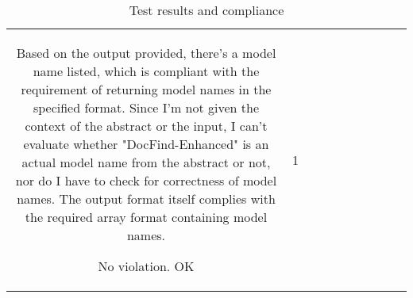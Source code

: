 \begin{table}[h!]
\begin{tabular}{|c|c|c|c|c|c|c|c|c|c|}
Based on the output provided, there's a model name listed, which is compliant with the requirement of returning model names in the specified format. Since I'm not given the context of the abstract or the input, I can't evaluate whether "DocFind-Enhanced" is an actual model name from the abstract or not, nor do I have to check for correctness of model names. The output format itself complies with the required array format containing model names.

No violation.
OK & 1
  \end{tabular}
  \caption{Test results and compliance}
  
  \end{table}
  
